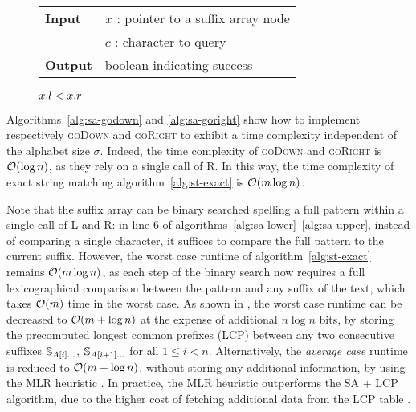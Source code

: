 \begin{figure*}[b!]
\begin{center}
\begin{minipage}[t]{.6\textwidth}
\begin{algorithm}[H]
\begin{tabular}{ll}
\textbf{Input}  & $x$ : pointer to a suffix array node\\
				& $c$ : character to query\\
\textbf{Output} & boolean indicating success\\
\end{tabular}
\begin{algorithmic}[1]
	\State \Return \False
\EndIf
{}
\State \Return $x.l < x.r$
\end{algorithmic}
\label{alg:sa-godownc}
\end{algorithm}
\end{minipage}
\end{center}
\end{figure*}

Algorithms~\ref{alg:sa-godown} and \ref{alg:sa-goright} show how to implement respectively \textsc{goDown} and \textsc{goRight} to exhibit a time complexity independent of the alphabet size $\sigma$.
Indeed, the time complexity of \textsc{goDown} and \textsc{goRight} is $\mathcal{O}(\log{n})$, as they rely on a single call of \textsc{R}.
In this way, the time complexity of exact string matching algorithm~\ref{alg:st-exact} is $\mathcal{O}(m \log{n})$.

Note that the suffix array can be binary searched spelling a full pattern within a single call of \textsc{L} and \textsc{R}: in line 6 of algorithms~\ref{alg:sa-lower}--\ref{alg:sa-upper}, instead of comparing a single character, it suffices to compare the full pattern to the current suffix.
However, the worst case runtime of algorithm~\ref{alg:st-exact} remains $\mathcal{O}(m \log{n})$, as each step of the binary search now requires a full lexicographical comparison between the pattern and any suffix of the text, which takes $\mathcal{O}(m)$ time in the worst case.
As shown in \citep{Manber1990}, the worst case runtime can be decreased to $\mathcal{O}(m + \log{n})$ at the expense of additional $n \log{n}$ bits, by storing the precomputed longest common prefixes (LCP) between any two consecutive suffixes $\mathbb {S}_{A[i] \dots}$, $\mathbb {S}_{A[i+1] \dots}$ for all $1 \leq i < n$.
Alternatively, the \emph{average case} runtime is reduced to $\mathcal{O}(m + \log{n})$, without storing any additional information, by using the MLR heuristic \citep{Manber1990}.
In practice, the MLR heuristic outperforms the SA + LCP algorithm, due to the higher cost of fetching additional data from the LCP table \citep{Weese2013}.

